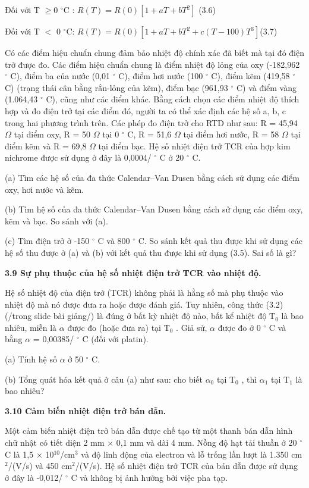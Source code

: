 \documentclass[12pt]{article}
\newcommand{\bt}[1]{\textbf{#1}}
\begin{document}
Đối với T $\geq$0 $^\circ$C : $R(T)=R(0)[1+aT+bT^2]$ (3.6)

Đối với T $<$ 0 $^\circ$C: $R(T)=R(0)[1+aT+bT^2+c(T-100)T^3]$(3.7)

Có các điểm hiệu chuẩn chung đảm bảo nhiệt độ chính xác đã biết mà tại đó điện trở được đo. Các điểm hiệu chuẩn chung là điểm nhiệt độ lỏng của oxy (-182,962 $^\circ$ C), điểm ba của nước (0,01 $^\circ$ C), điểm hơi nước (100 $^\circ$ C), điểm kẽm (419,58 $^\circ$ C) (trạng thái cân bằng rắn-lỏng của kẽm), điểm bạc (961,93 $^\circ$ C) và điểm vàng (1.064,43 $^\circ$ C), cũng như các điểm khác. Bằng cách chọn các điểm nhiệt độ thích hợp và đo điện trở tại các điểm đó, người ta có thể xác định các hệ số a, b, c trong hai phương trình trên. Các phép đo điện trở cho RTD như sau: R = 45,94 $\Omega$ tại điểm oxy, R = 50 $\Omega$ tại 0 $^\circ$ C, R = 51,6 $\Omega$ tại điểm hơi nước, R = 58 $\Omega$ tại điểm kẽm và R = 69,8 $\Omega$ tại điểm bạc. Hệ số nhiệt điện trở TCR của hợp kim nichrome được sử dụng ở đây là 0,0004/ $^\circ$ C ở 20 $^\circ$ C.

(a) Tìm các hệ số của đa thức Calendar–Van Dusen bằng cách sử dụng các điểm oxy, hơi nước và kẽm.

(b) Tìm hệ số của đa thức Calendar–Van Dusen bằng cách sử dụng các điểm oxy, kẽm và bạc. So sánh với (a).

(c) Tìm điện trở ở -150 $^\circ$ C và 800 $^\circ$ C. So sánh kết quả thu được khi sử dụng các hệ số thu được ở (a) và (b) với kết quả thu được khi sử dụng (3.5). Sai số là gì?

\bt{3.9 Sự phụ thuộc của hệ số nhiệt điện trở TCR vào nhiệt độ.}

Hệ số nhiệt độ của điện trở (TCR) không phải là hằng số mà phụ thuộc vào nhiệt độ mà nó được đưa ra hoặc được đánh giá. Tuy nhiên, công thức (3.2) (/trong slide bài giảng/) là đúng ở bất kỳ nhiệt độ nào, bất kể nhiệt độ T$_0$ là bao nhiêu, miễn là $\alpha$ được đo (hoặc đưa ra) tại T$_0$ . Giả sử, $\alpha$ được đo ở 0 $^\circ$ C và bằng $\alpha$ = 0,00385/ $^\circ$ C (đối với platin).

(a) Tính hệ số $\alpha$ ở 50 $^\circ$ C.

(b) Tổng quát hóa kết quả ở câu (a) như sau: cho biết $\alpha_0$ tại T$_0$ , thì $\alpha_1$ tại T$_1$ là bao nhiêu?

\bt{3.10 Cảm biến nhiệt điện trở bán dẫn.}

Một cảm biến nhiệt điện trở bán dẫn được chế tạo từ một thanh bán dẫn hình chữ nhật có tiết diện 2 mm $\times$ 0,1 mm và dài 4 mm. Nồng độ hạt tải thuần ở 20 $^\circ$ C là 1,5 $\times$ 10$^{10}$/cm$^3$ và độ linh động của electron và lỗ trống lần lượt là 1.350 cm$^2$/(V/s) và 450 cm$^2$/(V/s). Hệ số nhiệt điện trở TCR của bán dẫn được sử dụng ở đây là -0,012/ $^\circ$ C và không bị ảnh hưởng bởi việc pha tạp.
\end{document}
